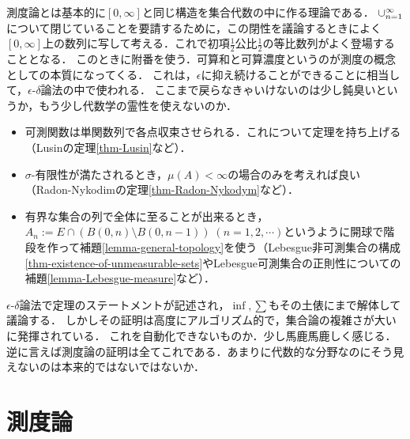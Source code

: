 \documentclass[uplatex, dvipdfmx]{jsreport}
\begin{document}
\begin{discussion}
    測度論とは基本的に$[0,\infty]$と同じ構造を集合代数の中に作る理論である．
    $\cup_{n=1}^\infty$について閉じていることを要請するために，この閉性を議論するときによく$[0,\infty]$上の数列に写して考える．これで初項$\frac{1}{2}$公比$\frac{1}{2}$の等比数列がよく登場することとなる．
    このときに附番を使う．可算和と可算濃度というのが測度の概念としての本質になってくる．
    これは，$\epsilon$に抑え続けることができることに相当して，$\epsilon$-$\delta$論法の中で使われる．
    ここまで戻らなきゃいけないのは少し鈍臭いというか，もう少し代数学の霊性を使えないのか．
    \begin{itemize}
        \item 可測関数は単関数列で各点収束させられる．これについて定理を持ち上げる（Lusinの定理\ref{thm-Lusin}など）．
        \item $\sigma$-有限性が満たされるとき，$\mu(A)<\infty$の場合のみを考えれば良い（Radon-Nykodimの定理\ref{thm-Radon-Nykodym}など）．
        \item 有界な集合の列で全体に至ることが出来るとき，$A_n:=E\cap(B(0,n)\setminus B(0,n-1))\;(n=1,2,\cdots)$というように開球で階段を作って補題\ref{lemma-general-topology}を使う（Lebesgue非可測集合の構成\ref{thm-existence-of-unmeasurable-sets}やLebesgue可測集合の正則性についての補題\ref{lemma-Lebesgue-measure}など）．
    \end{itemize}
\end{discussion}

\begin{discussion}[$\epsilon$-$\delta$]
    $\epsilon$-$\delta$論法で定理のステートメントが記述され，$\inf,\sum$もその土俵にまで解体して議論する．
    しかしその証明は高度にアルゴリズム的で，集合論の複雑さが大いに発揮されている．
    これを自動化できないものか．少し馬鹿馬鹿しく感じる．
    逆に言えば測度論の証明は全てこれである．あまりに代数的な分野なのにそう見えないのは本来的ではないではないか．
\end{discussion}

\chapter{測度論}
\end{document}
